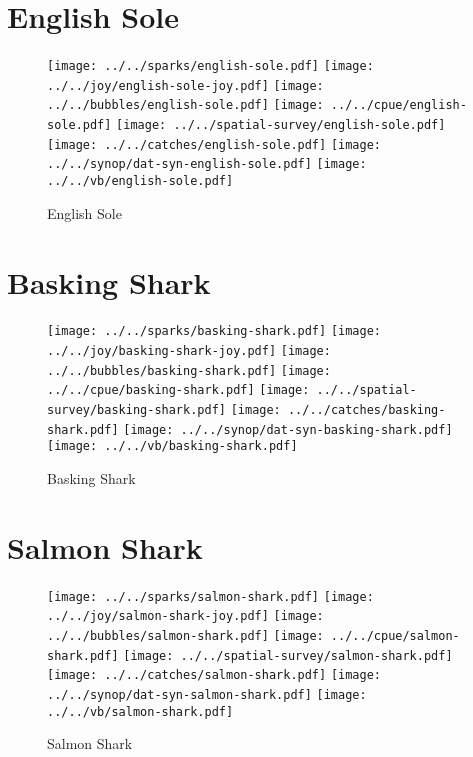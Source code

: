 \section{English Sole}

\begin{figure}[htbp]
\centering
\texttt{[image: ../../sparks/english-sole.pdf]}
\texttt{[image: ../../joy/english-sole-joy.pdf]}
\texttt{[image: ../../bubbles/english-sole.pdf]}
\texttt{[image: ../../cpue/english-sole.pdf]}
\texttt{[image: ../../spatial-survey/english-sole.pdf]}
\texttt{[image: ../../catches/english-sole.pdf]}
\texttt{[image: ../../synop/dat-syn-english-sole.pdf]}
\texttt{[image: ../../vb/english-sole.pdf]}
\caption{English Sole}
\end{figure}
\clearpage
\section{Basking Shark}

\begin{figure}[htbp]
\centering
\texttt{[image: ../../sparks/basking-shark.pdf]}
\texttt{[image: ../../joy/basking-shark-joy.pdf]}
\texttt{[image: ../../bubbles/basking-shark.pdf]}
\texttt{[image: ../../cpue/basking-shark.pdf]}
\texttt{[image: ../../spatial-survey/basking-shark.pdf]}
\texttt{[image: ../../catches/basking-shark.pdf]}
\texttt{[image: ../../synop/dat-syn-basking-shark.pdf]}
\texttt{[image: ../../vb/basking-shark.pdf]}
\caption{Basking Shark}
\end{figure}
\clearpage
\section{Salmon Shark}

\begin{figure}[htbp]
\centering
\texttt{[image: ../../sparks/salmon-shark.pdf]}
\texttt{[image: ../../joy/salmon-shark-joy.pdf]}
\texttt{[image: ../../bubbles/salmon-shark.pdf]}
\texttt{[image: ../../cpue/salmon-shark.pdf]}
\texttt{[image: ../../spatial-survey/salmon-shark.pdf]}
\texttt{[image: ../../catches/salmon-shark.pdf]}
\texttt{[image: ../../synop/dat-syn-salmon-shark.pdf]}
\texttt{[image: ../../vb/salmon-shark.pdf]}
\caption{Salmon Shark}
\end{figure}
\clearpage
